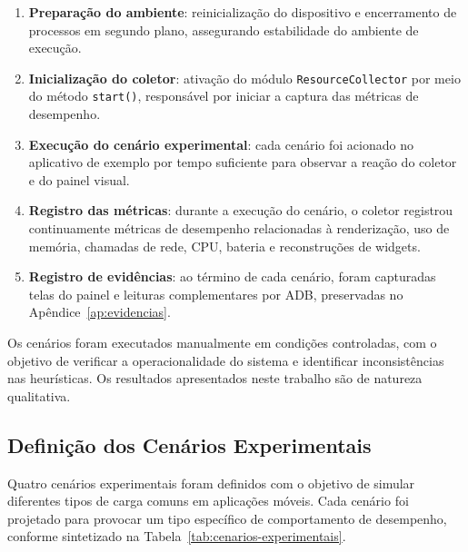 \begin{enumerate}

\item \textbf{Preparação do ambiente}: reinicialização do dispositivo e encerramento de processos em segundo plano, assegurando estabilidade do ambiente de execução.

\item \textbf{Inicialização do coletor}: ativação do módulo \texttt{ResourceCollector} por meio do método \texttt{start()}, responsável por iniciar a captura das métricas de desempenho.

\item \textbf{Execução do cenário experimental}: cada cenário foi acionado no aplicativo de exemplo por tempo suficiente para observar a reação do coletor e do painel visual.

\item \textbf{Registro das métricas}: durante a execução do cenário, o coletor registrou continuamente métricas de desempenho relacionadas à renderização, uso de memória, chamadas de rede, CPU, bateria e reconstruções de widgets.

\item \textbf{Registro de evidências}: ao término de cada cenário, foram capturadas telas do painel e leituras complementares por ADB, preservadas no Apêndice~\ref{ap:evidencias}.

\end{enumerate}

Os cenários foram executados manualmente em condições controladas, com o objetivo de verificar a operacionalidade do sistema e identificar inconsistências nas heurísticas. Os resultados apresentados neste trabalho são de natureza qualitativa.

\subsection{Definição dos Cenários Experimentais}

Quatro cenários experimentais foram definidos com o objetivo de simular diferentes tipos de carga comuns em aplicações móveis. Cada cenário foi projetado para provocar um tipo específico de comportamento de desempenho, conforme sintetizado na Tabela~\ref{tab:cenarios-experimentais}.

